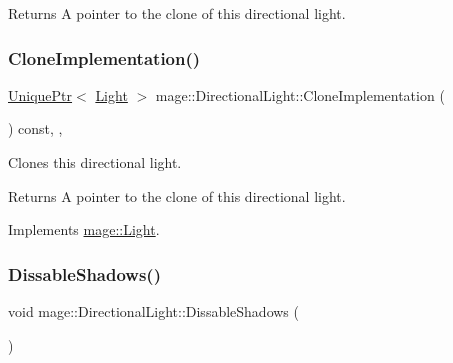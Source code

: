 \begin{DoxyReturn}{Returns}
A pointer to the clone of this directional light. 
\end{DoxyReturn}
\hypertarget{classmage_1_1_directional_light_a122d3dcd7633a85ef8a85e7d768da36d}{}\label{classmage_1_1_directional_light_a122d3dcd7633a85ef8a85e7d768da36d} 
\subsubsection{\texorpdfstring{Clone\+Implementation()}{CloneImplementation()}}
{\footnotesize\ttfamily \hyperlink{namespacemage_a3316d7143a973e37adf1110f2e80ca31}{Unique\+Ptr}$<$ \hyperlink{classmage_1_1_light}{Light} $>$ mage\+::\+Directional\+Light\+::\+Clone\+Implementation (\begin{DoxyParamCaption}{ }\end{DoxyParamCaption}) const\hspace{0.3cm}{\ttfamily [override]}, {\ttfamily [private]}, {\ttfamily [virtual]}}

Clones this directional light.

\begin{DoxyReturn}{Returns}
A pointer to the clone of this directional light. 
\end{DoxyReturn}


Implements \hyperlink{classmage_1_1_light_aa613d76a1ebda69efde853d15f75490c}{mage\+::\+Light}.

\hypertarget{classmage_1_1_directional_light_addd4803dee85892dfd57f51e155c6572}{}\label{classmage_1_1_directional_light_addd4803dee85892dfd57f51e155c6572} 
\subsubsection{\texorpdfstring{Dissable\+Shadows()}{DissableShadows()}}
{\footnotesize\ttfamily void mage\+::\+Directional\+Light\+::\+Dissable\+Shadows (\begin{DoxyParamCaption}{ }\end{DoxyParamCaption})\hspace{0.3cm}{\ttfamily [noexcept]}}

